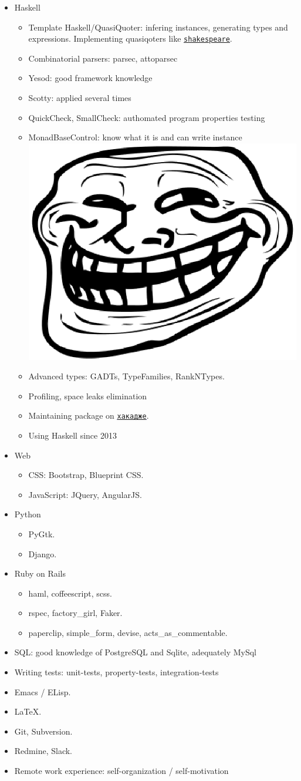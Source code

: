 \documentclass[11pt,a4paper,sans]{moderncv}
\newcommand*{\nlink}[2]{\textcolor{blue}{\texttt{\underline{\href{#1}{#2}}}}}
\begin{document}
\begin{itemize}
\item Haskell
  \begin{itemize}
  \item Template Haskell/QuasiQuoter: infering instances, generating
    types and expressions. Implementing quasiqoters like
    \nlink{http://hackage.haskell.org/package/shakespeare}{shakespeare}.
  \item Combinatorial parsers: parsec, attoparsec
  \item Yesod: good framework knowledge
  \item Scotty: applied several times
  \item QuickCheck, SmallCheck: authomated program properties testing
  \item MonadBaseControl: know what it is and can write instance
    \includegraphics[height=0.9ex]{Trollface.ps}
  \item Advanced types: GADTs, TypeFamilies, RankNTypes.
  \item Profiling, space leaks elimination
  \item Maintaining package on
    \nlink{http://hackage.haskell.org/user/AlekseyUymanov}{хакадже}.
  \item Using Haskell since 2013
  \end{itemize}
\item Web
  \begin{itemize}
  \item CSS: Bootstrap, Blueprint CSS.
  \item JavaScript: JQuery, AngularJS.
  \end{itemize}
\item Python
  \begin{itemize}
  \item PyGtk.
  \item Django.
  \end{itemize}
\item Ruby on Rails
  \begin{itemize}
  \item haml, coffeescript, scss.
  \item rspec, factory\_girl, Faker.
  \item paperclip, simple\_form, devise, acts\_as\_commentable.
  \end{itemize}
\item SQL: good knowledge of PostgreSQL and Sqlite, adequately MySql
\item Writing tests: unit-tests, property-tests, integration-tests
\item Emacs / ELisp.
\item \LaTeX.
\item Git, Subversion.
\item Redmine, Slack.
\item Remote work experience: self-organization / self-motivation
\end{itemize}
\end{document}
